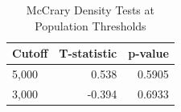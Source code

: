\begin{table}[!h]
\centering
\caption{\label{tab:density}McCrary Density Tests at Population Thresholds}
\centering
\begin{tabular}[t]{lrr}
\toprule
Cutoff & T-statistic & p-value\\
\midrule
5,000 & 0.538 & 0.5905\\
3,000 & -0.394 & 0.6933\\
\bottomrule
\end{tabular}
\end{table}
